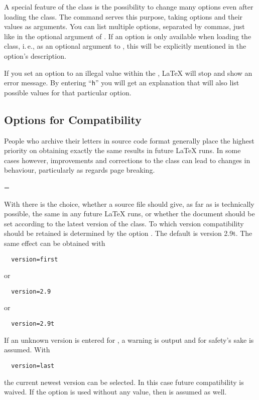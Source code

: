 \begin{Declaration}
\end{Declaration}
%
A special feature of the  class is the possibility to
change many options even after loading the class. The
 command serves this purpose, taking options and
their values as arguments. You can list multiple options, separated by
commas, just like in the optional argument of
. If an option is only available when loading the
class, i.\,e., as an optional argument to , this
will be explicitly mentioned in the option's description.

\begin{Explain}
  If you set an option to an illegal value within the , {\LaTeX} will stop and show an error message. By entering
  ``\texttt{h}'' you will get an explanation that will also list
  possible values for that particular option.
\end{Explain}
%
%
%

\subsection{Options for  Compatibility}
\label{sec:scrlttr2.compatibilityOptions}
%

People who archive their letters in source code format generally place
the highest priority on obtaining exactly the same results in future
{\LaTeX} runs. In some cases however, improvements and corrections to
the class can lead to changes in behaviour, particularly as regards
page breaking.

\begin{Declaration}
  =
\end{Declaration}
%
With  there is the
choice, whether a source file should give, as far as is technically
possible, the same in any future {\LaTeX} runs, or whether the
document should be set according to the latest version of the
class. To which version compatibility should be retained is determined
by the option . The default is version 2.9t. The same effect can be obtained with
\begin{lstlisting}
  version=first
\end{lstlisting}
or
\begin{lstlisting}
  version=2.9
\end{lstlisting}
or
\begin{lstlisting}
  version=2.9t
\end{lstlisting}
If an unknown version is entered for , a warning is
output and for safety's sake  is
assumed. With
\begin{lstlisting}
  version=last
\end{lstlisting}
the current newest version can be selected. In this case future
compatibility is waived. If the option is used without any value, then
 is assumed as well.

